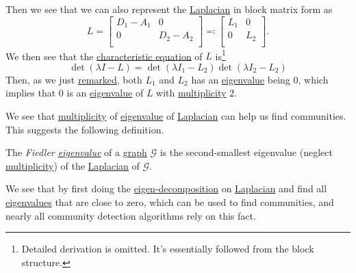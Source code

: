 Then we see that we can also represent the \hyperref[def:Laplacian]{Laplacian} in block matrix form as
\[
	L = \begin{bmatrix}
		D_{1} - A_{1} & 0         \\
		0             & D_2 - A_2 \\
	\end{bmatrix} \eqqcolon \begin{bmatrix}
		L_{1} & 0   \\
		0     & L_2 \\
	\end{bmatrix}.
\]
We then see that the \hyperref[note:characteristic-equation]{characteristic equation} of \(L\) is\footnote{Detailed derivation is omitted. It's essentially followed from the block structure.}
\[
	\det(\lambda I - L) = \det(\lambda I_1 - L_2)\det(\lambda  I_2 - L_2)
\]
Then, as we just \hyperref[rmk:property-of-Laplacian]{remarked}, both \(L_1\) and \(L_2\) has an \hyperref[def:eigenvalue]{eigenvalue} being \(0\), which implies that \(0\) is an \hyperref[def:eigenvalue]{eigenvalue} of \(L\) with \hyperref[def:multiplicity]{multiplicity} \(2\).

We see that \hyperref[def:multiplicity]{multiplicity} of \hyperref[def:eigenvalue]{eigenvalue} of \hyperref[def:Laplacian]{Laplacian} can help us find communities. This suggests the following definition.

\begin{definition}\label{def:Filder-eigenvalue}
	The \emph{Fiedler \hyperref[def:eigenvalue]{eigenvalue}} of a \hyperref[def:graph]{graph} \(\mathcal{G}\) is the second-smallest eigenvalue (neglect \hyperref[def:multiplicity]{multiplicity}) of the \hyperref[def:Laplacian]{Laplacian} of \(\mathcal{G}\).
\end{definition}

We see that by first doing the \hyperref[thm:eigen-decomposition]{eigen-decomposition} on \hyperref[def:Laplacian]{Laplacian} and find all \hyperref[def:eigenvalue]{eigenvalues} that are close to zero, which can be used to find communities, and nearly all community detection algorithms rely on this fact.

